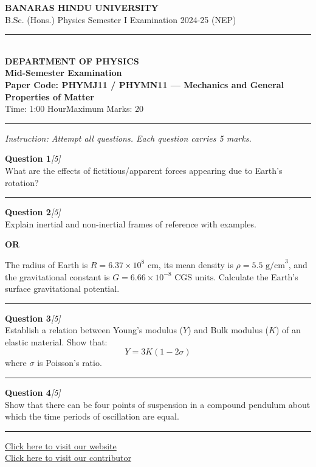 \documentclass[11pt,a4paper]{article}
\newcommand{\pts}[1]{\hfill   \textit{[#1]}}
\begin{document}
\begin{center}
  {\large\bfseries BANARAS HINDU UNIVERSITY}\\[2pt]
  {
\normalsize B.Sc. (Hons.) Physics Semester I Examination 2024-25 (NEP)}\\[6pt]
  \rule{0.8\linewidth}{0.5pt}\\[6pt]
  {\large\bfseries DEPARTMENT OF PHYSICS}\\[4pt]
  {\large\bfseries Mid-Semester Examination}\\[4pt]
  {\large\bfseries Paper Code: PHYMJ11 / PHYMN11 --- Mechanics and General Properties of Matter}\\[4pt]
  {
\normalsize Time: 1:00 Hour\hfill Maximum Marks: 20}
\end{center}

\rule{\linewidth}{0.4pt}\smallskip



\noindent   \textit{Instruction: Attempt all questions. Each question carries 5 marks.}
\bigskip




\noindent   \textbf{Question 1}\pts{5} \\
What are the effects of fictitious/apparent forces appearing due to Earth's rotation?

\medskip\rule{\linewidth}{0.2pt}\medskip




\noindent   \textbf{Question 2}\pts{5} \\
Explain inertial and non-inertial frames of reference with examples.


\begin{center}   \textbf{OR}\end{center}

The radius of Earth is $R = 6.37  \times 10^8 \text{ cm}$, its mean density is $\rho = 5.5 \text{ g/cm}^3$, and the gravitational constant is $G = 6.66  \times 10^{-8} \text{ CGS units}$. Calculate the Earth's surface gravitational potential.

\medskip\rule{\linewidth}{0.2pt}\medskip




\noindent   \textbf{Question 3}\pts{5} \\
Establish a relation between Young's modulus ($Y$) and Bulk modulus ($K$) of an elastic material. Show that:
\[
Y = 3K(1 - 2\sigma)
\]
where $\sigma$ is Poisson's ratio.

\medskip\rule{\linewidth}{0.2pt}\medskip




\noindent   \textbf{Question 4}\pts{5} \\
Show that there can be four points of suspension in a compound pendulum about which the time periods of oscillation are equal.

\vfill\rule{\linewidth}{0.4pt}

\begin{center}\small
\href{https://bhu-exam.vercel.app/}{Click here to visit our website}\\[4pt]
\href{https://me-aryan.vercel.app/}{Click here to visit our contributor}
\end{center}
\end{document}

